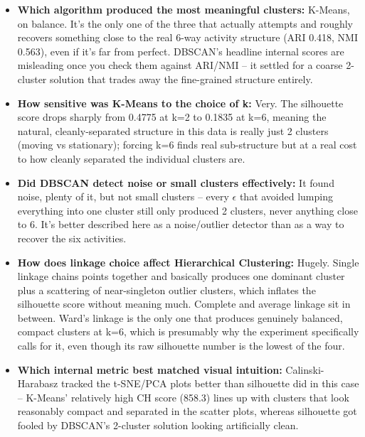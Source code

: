 \documentclass[12pt,a4paper]{article}
\begin{document}
\begin{itemize}
\item \textbf{Which algorithm produced the most meaningful clusters:} K-Means, on balance. It's the
only one of the three that actually attempts and roughly recovers something close to the real 6-way
activity structure (ARI 0.418, NMI 0.563), even if it's far from perfect. DBSCAN's headline internal
scores are misleading once you check them against ARI/NMI -- it settled for a coarse 2-cluster
solution that trades away the fine-grained structure entirely.
\item \textbf{How sensitive was K-Means to the choice of k:} Very. The silhouette score drops sharply
from 0.4775 at k=2 to 0.1835 at k=6, meaning the natural, cleanly-separated structure in this data is
really just 2 clusters (moving vs stationary); forcing k=6 finds real sub-structure but at a real cost
to how cleanly separated the individual clusters are.
\item \textbf{Did DBSCAN detect noise or small clusters effectively:} It found noise, plenty of it,
but not small clusters -- every $\epsilon$ that avoided lumping everything into one cluster still only
produced 2 clusters, never anything close to 6. It's better described here as a noise/outlier
detector than as a way to recover the six activities.
\item \textbf{How does linkage choice affect Hierarchical Clustering:} Hugely. Single linkage chains
points together and basically produces one dominant cluster plus a scattering of near-singleton
outlier clusters, which inflates the silhouette score without meaning much. Complete and average
linkage sit in between. Ward's linkage is the only one that produces genuinely balanced, compact
clusters at k=6, which is presumably why the experiment specifically calls for it, even though its raw
silhouette number is the lowest of the four.
\item \textbf{Which internal metric best matched visual intuition:} Calinski-Harabasz tracked the
t-SNE/PCA plots better than silhouette did in this case -- K-Means' relatively high CH score (858.3)
lines up with clusters that look reasonably compact and separated in the scatter plots, whereas
silhouette got fooled by DBSCAN's 2-cluster solution looking artificially clean.
\end{itemize}
\end{document}
